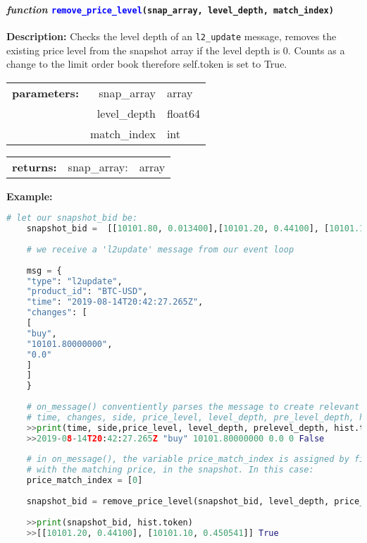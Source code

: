 \paragraph{\textit{function} \textcolor{blue}{\texttt{remove\_price\_level}}\texttt{(snap\_array, level\_depth, match\_index)}}
\hfill \break
\textbf{Description:} Checks the level depth of an \texttt{l2\_update} message, removes the existing price level from the snapshot array if the level depth is 0. Counts as a change to the limit order book therefore self.token is set to True. 

\begin{tabular}{r r l }
	\textbf{parameters:}	& snap\_array & array\\
	& level\_depth & float64\\
	& match\_index& int\\ 
\end{tabular}

\begin{tabular}{r r l}
	\textbf{returns:} & snap\_array: & array\\
\end{tabular}

\textbf{Example:}
\begin{lstlisting}[language=Python]
	# let our snapshot_bid be:
	snapshot_bid =  [[10101.80, 0.013400],[10101.20, 0.44100], [10101.10, 0.450541]]
	
	# we receive a 'l2update' message from our event loop
	
	msg = {
	"type": "l2update",
	"product_id": "BTC-USD",
	"time": "2019-08-14T20:42:27.265Z",
	"changes": [
	[
	"buy",
	"10101.80000000",
	"0.0"
	]
	]
	}
	
	# on_message() conventiently parses the message to create relevant local variables
	# time, changes, side, price_level, level_depth, pre_level_depth, hist.token
	>>print(time, side,price_level, level_depth, prelevel_depth, hist.token)
	>>2019-08-14T20:42:27.265Z "buy" 10101.80000000 0.0 0 False
		
	# in on_message(), the variable price_match_index is assigned by finding the index
	# with the matching price, in the snapshot. In this case:
	price_match_index = [0] 
	
	snapshot_bid = remove_price_level(snapshot_bid, level_depth, price_match_index)
	
	>>print(snapshot_bid, hist.token)
	>>[[10101.20, 0.44100], [10101.10, 0.450541]] True
\end{lstlisting}

